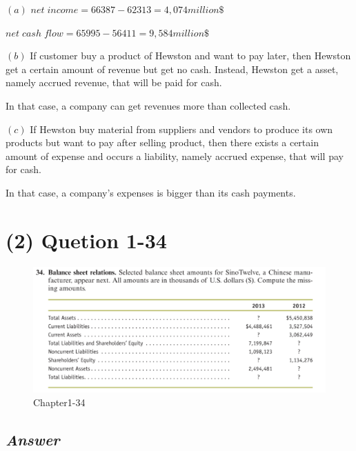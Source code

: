 \documentclass[
  letterpaper,
  DIV=11,
  numbers=noendperiod]{scrreprt}
\begin{document}
\textbf{\((a)\)} \(net\; income=66387-62313=4,074million\$\)

\(net\; cash\;flow=65995-56411=9,584million\$\)

\textbf{\((b)\)} If customer buy a product of Hewston and want to pay
later, then Hewston get a certain amount of revenue but get no cash.
Instead, Hewston get a asset, namely accrued revenue, that will be paid
for cash.

In that case, a company can get revenues more than collected cash.

\textbf{\((c)\)} If Hewston buy material from suppliers and vendors to
produce its own products but want to pay after selling product, then
there exists a certain amount of expense and occurs a liability, namely
accrued expense, that will pay for cash.

In that case, a company's expenses is bigger than its cash payments.

\section*{(2) Quetion 1-34}\label{quetion-1-34}


\begin{figure}[H]

{\centering \includegraphics{images/재무회계_hw2_1-34.png}

}

\caption{Chapter1-34}

\end{figure}%

\subsection*{\texorpdfstring{\textbf{\emph{Answer}}}{Answer}}\label{answer-6}
\end{document}
